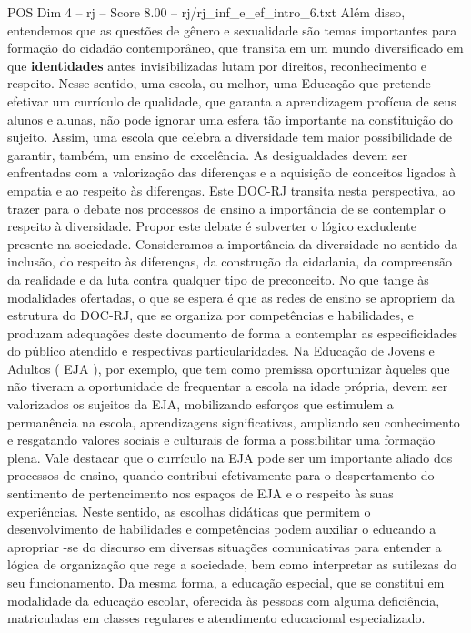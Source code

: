 \begin{textsample}{POS Dim 4 – rj – Score 8.00 – rj/rj\_inf\_e\_ef\_intro\_6.txt}
Além disso, entendemos que as questões de gênero e sexualidade são temas importantes para formação do cidadão contemporâneo, que transita em um mundo diversificado em que \textbf{identidades} antes invisibilizadas lutam por direitos, reconhecimento e respeito.
Nesse sentido, uma escola, ou melhor, uma Educação que pretende efetivar um currículo de qualidade, que garanta a aprendizagem profícua de seus alunos e alunas, não pode ignorar uma esfera tão importante na constituição do sujeito.
Assim, uma escola que celebra a diversidade tem maior possibilidade de garantir, também, um ensino de excelência.
As desigualdades devem ser enfrentadas com a valorização das diferenças e a aquisição de conceitos ligados à empatia e ao respeito às diferenças.
Este DOC-RJ transita nesta perspectiva, ao trazer para o debate nos processos de ensino a importância de se contemplar o respeito à diversidade.
Propor este debate é subverter o lógico excludente presente na sociedade.
Consideramos a importância da diversidade no sentido da inclusão, do respeito às diferenças, da construção da cidadania, da compreensão da realidade e da luta contra qualquer tipo de preconceito.
No que tange às modalidades ofertadas, o que se espera é que as redes de ensino se apropriem da estrutura do DOC-RJ, que se organiza por competências e habilidades, e produzam adequações deste documento de forma a contemplar as especificidades do público atendido e respectivas particularidades.
Na Educação de Jovens e Adultos ( EJA ), por exemplo, que tem como premissa oportunizar àqueles que não tiveram a oportunidade de frequentar a escola na idade própria, devem ser valorizados os sujeitos da EJA, mobilizando esforços que estimulem a permanência na escola, aprendizagens significativas, ampliando seu conhecimento e resgatando valores sociais e culturais de forma a possibilitar uma formação plena.
Vale destacar que o currículo na EJA pode ser um importante aliado dos processos de ensino, quando contribui efetivamente para o despertamento do sentimento de pertencimento nos espaços de EJA e o respeito às suas experiências.
Neste sentido, as escolhas didáticas que permitem o desenvolvimento de habilidades e competências podem auxiliar o educando a apropriar -se do discurso em diversas situações comunicativas para entender a lógica de organização que rege a sociedade, bem como interpretar as sutilezas do seu funcionamento.
Da mesma forma, a educação especial, que se constitui em modalidade da educação escolar, oferecida às pessoas com alguma deficiência, matriculadas em classes regulares e atendimento educacional especializado.

\end{textsample}
